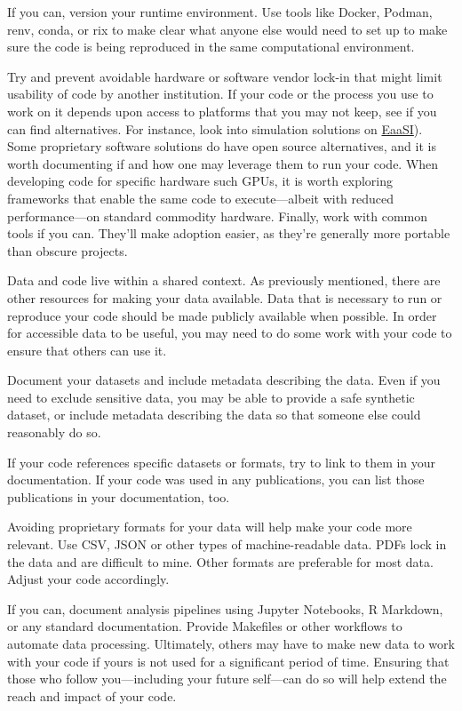 \documentclass[10pt,letterpaper]{article}
\begin{document}
If you can, version your runtime environment.
Use tools like Docker, Podman, renv, conda, or rix to make clear
what anyone else would need to set up
to make sure the code is being reproduced in the same computational environment.

Try and prevent avoidable hardware or software vendor lock-in
that might limit usability of code by another institution.
If your code or the process you use to work on it
depends upon access to platforms that you may not keep,
see if you can find alternatives.
For instance,
look into simulation solutions on
\href{https://www.softwarepreservationnetwork.org/emulation-as-a-service-infrastructure/}{EaaSI}).
Some proprietary software solutions do have open source alternatives,
and it is worth documenting if and how one may leverage them to run your code.
When developing code for specific hardware such GPUs,
it is worth exploring frameworks that enable the same code to execute---albeit
with reduced performance---on standard commodity hardware.
Finally,
work with common tools if you can.
They'll make adoption easier,
as they're generally more portable than obscure projects.

Data and code live within a shared context.
As previously mentioned, there are other resources for making your data available.
Data that is necessary to run or reproduce your code should be made publicly available when possible.
In order for accessible data to be useful,
you may need to do some work with your code to ensure that others can use it.

Document your datasets and include metadata describing the data.
Even if you need to exclude sensitive data,
you may be able to provide a safe synthetic dataset,
or include metadata describing the data so that someone else could reasonably do so.

If your code references specific datasets or formats,
try to link to them in your documentation.
If your code was used in any publications,
you can list those publications in your documentation, too.

Avoiding proprietary formats for your data will help make your code more relevant.
Use CSV, JSON or other types of machine-readable data.
PDFs lock in the data and are difficult to mine.
Other formats are preferable for most data.
Adjust your code accordingly.

If you can, document analysis pipelines using Jupyter Notebooks,
R Markdown,
or any standard documentation.
Provide Makefiles or other workflows to automate data processing.
Ultimately,
others may have to make new data to work with your code if yours is not used for a significant period of time.
Ensuring that those who follow you---including your future self---can do so
will help extend the reach and impact of your code.
\end{document}
